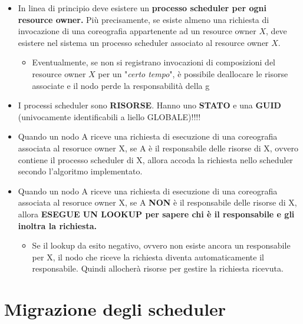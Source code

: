 \documentclass[10pt,a4paper]{article}
\begin{document}
\begin{itemize}
\item In linea di principio deve esistere un \textbf{processo scheduler per ogni resource owner.} Più precisamente, se esiste almeno una richiesta di invocazione di una coreografia appartenente ad un resource owner $X$, deve esistere nel sistema un processo scheduler associato al resource owner $X$.

\begin{itemize}
\item Eventualmente, se non si registrano invocazioni di composizioni del resource owner $X$ per un "\textit{certo tempo}", è possibile deallocare le risorse associate e il nodo perde la responsabilità della g
\end{itemize}

\item I processi scheduler sono \textbf{RISORSE}. Hanno uno \textbf{STATO} e una \textbf{GUID} (univocamente identificabili a liello GLOBALE)!!!!

\item Quando un nodo A riceve una richiesta di esecuzione di una coreografia associata al resoruce owner X, se A è il responsabile delle risorse di X, ovvero contiene il processo scheduler di X, allora accoda la richiesta nello scheduler secondo l'algoritmo implementato.

\item Quando un nodo A riceve una richiesta di esecuzione di una coreografia associata al resoruce owner X, se A \textbf{NON} è il responsabile delle risorse di X, allora \textbf{ESEGUE UN LOOKUP per sapere chi è il responsabile e gli inoltra la richiesta.}

\begin{itemize}
\item Se il lookup da esito negativo, ovvero non esiste ancora un responsabile per X, il nodo che riceve la richiesta diventa automaticamente il responsabile. Quindi allocherà risorse per gestire la richiesta ricevuta.
\end{itemize}

\end{itemize}

\section{Migrazione degli scheduler}
\end{document}
